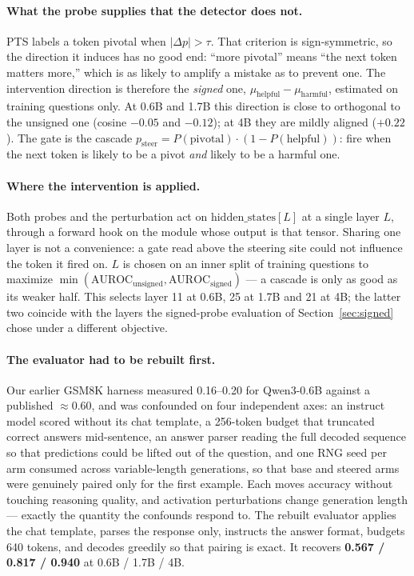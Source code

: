 \documentclass{article}
\newcommand{\pdelta}{\Delta p}
\begin{document}
\paragraph{What the probe supplies that the detector does not.} PTS labels
a token pivotal when $|\pdelta| > \tau$. That criterion is
sign-symmetric, so the direction it induces has no good end: ``more
pivotal'' means ``the next token matters more,'' which is as likely to
amplify a mistake as to prevent one. The intervention direction is
therefore the \emph{signed} one, $\mu_{\text{helpful}} -
\mu_{\text{harmful}}$, estimated on training questions only. At 0.6B and
1.7B this direction is close to orthogonal to the unsigned one (cosine
$-0.05$ and $-0.12$); at 4B they are mildly aligned ($+0.22$). The gate is
the cascade $p_{\text{steer}} = P(\text{pivotal}) \cdot (1 -
P(\text{helpful}))$: fire when the next token is likely to be a pivot
\emph{and} likely to be a harmful one.

\paragraph{Where the intervention is applied.} Both probes and the
perturbation act on $\text{hidden\_states}[L]$ at a single layer $L$,
through a forward hook on the module whose output is that tensor. Sharing
one layer is not a convenience: a gate read above the steering site could
not influence the token it fired on. $L$ is chosen on an inner split of
training questions to maximize $\min(\text{AUROC}_{\text{unsigned}},
\text{AUROC}_{\text{signed}})$ --- a cascade is only as good as its weaker
half. This selects layer 11 at 0.6B, 25 at 1.7B and 21 at 4B; the latter
two coincide with the layers the signed-probe evaluation of
Section~\ref{sec:signed} chose under a different objective.

\paragraph{The evaluator had to be rebuilt first.} Our earlier GSM8K
harness measured 0.16--0.20 for Qwen3-0.6B against a published
$\approx 0.60$, and was confounded on four independent axes: an instruct
model scored without its chat template, a 256-token budget that truncated
correct answers mid-sentence, an answer parser reading the full decoded
sequence so that predictions could be lifted out of the question, and one
RNG seed per arm consumed across variable-length generations, so that base
and steered arms were genuinely paired only for the first example. Each
moves accuracy without touching reasoning quality, and activation
perturbations change generation length --- exactly the quantity the
confounds respond to. The rebuilt evaluator applies the chat template,
parses the response only, instructs the answer format, budgets 640 tokens,
and decodes greedily so that pairing is exact. It recovers
\textbf{0.567 / 0.817 / 0.940} at 0.6B / 1.7B / 4B.
\end{document}
